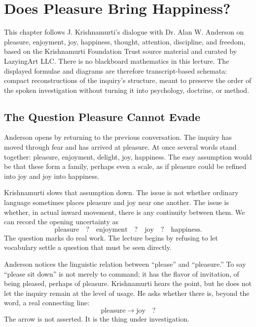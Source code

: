 \chapter{Does Pleasure Bring Happiness?}

This chapter follows J. Krishnamurti's dialogue with Dr. Alan W. Anderson on pleasure, enjoyment, joy, happiness, thought, attention, discipline, and freedom, based on the Krishnamurti Foundation Trust source material and curated by LazyingArt LLC. There is no blackboard mathematics in this lecture. The displayed formulae and diagrams are therefore transcript-based schemata: compact reconstructions of the inquiry's structure, meant to preserve the order of the spoken investigation without turning it into psychology, doctrine, or method.

\section{The Question Pleasure Cannot Evade}

Anderson opens by returning to the previous conversation. The inquiry has moved through fear and has arrived at pleasure. At once several words stand together: pleasure, enjoyment, delight, joy, happiness. The easy assumption would be that these form a family, perhaps even a scale, as if pleasure could be refined into joy and joy into happiness.

Krishnamurti slows that assumption down. The issue is not whether ordinary language sometimes places pleasure and joy near one another. The issue is whether, in actual inward movement, there is any continuity between them. We can record the opening uncertainty as
\begin{equation}
\text{pleasure} \quad ? \quad \text{enjoyment} \quad ? \quad \text{joy} \quad ? \quad \text{happiness}.
\end{equation}
The question marks do real work. The lecture begins by refusing to let vocabulary settle a question that must be seen directly.

Anderson notices the linguistic relation between ``please'' and ``pleasure.'' To say ``please sit down'' is not merely to command; it has the flavor of invitation, of being pleased, perhaps of pleasure. Krishnamurti hears the point, but he does not let the inquiry remain at the level of usage. He asks whether there is, beyond the word, a real connecting line:
\begin{equation}
\text{pleasure} \longrightarrow \text{joy} \quad ?
\end{equation}
The arrow is not asserted. It is the thing under investigation.

